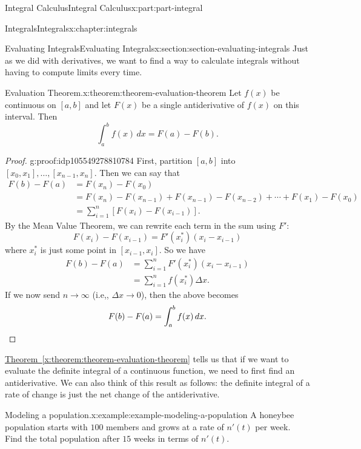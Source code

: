 \documentclass[twoside,10pt,]{book}
\newcommand{\xreffont}{\relax}
\numberwithin{equation}{part}
\newcommand{\qedhere}{\relax}
\begin{document}
\begin{partptx}{Integral Calculus}{}{Integral Calculus}{}{}{x:part:part-integral}
\begin{chapterptx}{Integrals}{}{Integrals}{}{}{x:chapter:integrals}
\begin{sectionptx}{Evaluating Integrals}{}{Evaluating Integrals}{}{}{x:section:section-evaluating-integrals}
Just as we did with derivatives, we want to find a way to calculate integrals without having to compute limits every time.%
\begin{theorem}{Evaluation Theorem.}{}{x:theorem:theorem-evaluation-theorem}%
Let \(f(x)\) be continuous on \([a,b]\) and let \(F(x)\) be a single antiderivative of \(f(x)\) on this interval. Then%
\begin{equation*}
\int_{a}^{b}f(x)\,dx = F(a) - F(b).
\end{equation*}
%
\end{theorem}
\begin{proof}{}{g:proof:idp105549278810784}
First, partition \([a,b]\) into \([x_{0},x_{1}],\ldots,[x_{n-1},x_{n}]\). Then we can say that%
\begin{align*}
F(b) - F(a) & = F(x_{n}) - F(x_{0}) \\
& = F(x_{n}) - F(x_{n-1}) + F(x_{n-1}) - F(x_{n-2}) + \cdots + F(x_{1}) - F(x_{0}) \\
& = \sum_{i=1}^{n}[F(x_{i}) - F(x_{i-1})]. 
\end{align*}
By the Mean Value Theorem, we can rewrite each term in the sum using \(F'\):%
\begin{equation*}
F(x_{i}) - F(x_{i-1}) = F'(x_{i}^{*})(x_{i} - x_{i-1})
\end{equation*}
where \(x_{i}^{*}\) is just some point in \([x_{i-1},x_{i}]\). So we have%
\begin{align*}
F(b) - F(a) & = \sum_{i=1}^{n}F'(x_{i}^{*})(x_{i} - x_{i-1}) \\
& = \sum_{i=1}^{n}f(x_{i}^{*})\Delta x. 
\end{align*}
If we now send \(n\to\infty\) (i.e,, \(\Delta x\to 0\)), then the above becomes%
\begin{equation*}
F(b) - F(a) = \int_{a}^{b}f(x)\,dx.\qedhere
\end{equation*}
%
\end{proof}
\hyperref[x:theorem:theorem-evaluation-theorem]{Theorem~{\xreffont\ref{x:theorem:theorem-evaluation-theorem}}} tells us that if we want to evaluate the definite integral of a continuous function, we need to first find an antiderivative. We can also think of this result as follows: the definite integral of a rate of change is just the net change of the antiderivative.%
\begin{example}{Modeling a population.}{x:example:example-modeling-a-population}%
A honeybee population starts with \(100\) members and grows at a rate of \(n'(t)\) per week. Find the total population after \(15\) weeks in terms of \(n'(t)\).%

\end{example}
\end{sectionptx}
\end{chapterptx}
\end{partptx}
\end{document}
